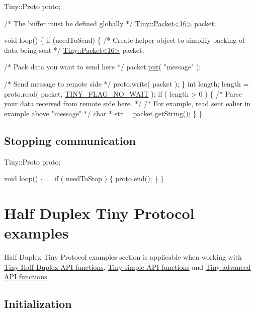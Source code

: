 \begin{DoxyCode}
Tiny::Proto proto;

\textcolor{comment}{/* The buffer must be defined globally */}
\hyperlink{classTiny_1_1Packet}{Tiny::Packet<16>} packet;

\textcolor{keywordtype}{void} loop()
\{
    \textcolor{keywordflow}{if} (needToSend)
    \{
        \textcolor{comment}{/* Create helper object to simplify packing of data being sent */}
        \hyperlink{classTiny_1_1Packet}{Tiny::Packet<16>} packet;

        \textcolor{comment}{/* Pack data you want to send here */}
        packet.\hyperlink{classTiny_1_1IPacket_a9d5ba62a453b9cd364c0e214c245f11d}{put}( \textcolor{stringliteral}{"message"} );

        \textcolor{comment}{/* Send message to remote side */}
        proto.write( packet );
    \}
    \textcolor{keywordtype}{int} length;
    length = proto.read( packet, \hyperlink{group__FLAGS__GROUP_gadadd60eb21d7949e6d097ad36aab9b2e}{TINY\_FLAG\_NO\_WAIT} );
    \textcolor{keywordflow}{if} ( length > 0 )
    \{
        \textcolor{comment}{/* Parse your data received from remote side here. */}
        \textcolor{comment}{/* For example, read sent ealier in example above "message" */}
        \textcolor{keywordtype}{char} * str = packet.\hyperlink{classTiny_1_1IPacket_ac6e6a22ce9a652954491a8d4db081d79}{getString}();
    \}
\}
\end{DoxyCode}
\hypertarget{arduino_arduino_tiny_close}{}\subsection{Stopping communication}\label{arduino_arduino_tiny_close}

\begin{DoxyCode}
Tiny::Proto proto;

\textcolor{keywordtype}{void} loop()
\{
    ...
    \textcolor{keywordflow}{if} ( needToStop )
    \{
        proto.end();
    \}
\}
\end{DoxyCode}
\hypertarget{arduino_arduino_tiny_hd}{}\section{Half Duplex Tiny Protocol examples}\label{arduino_arduino_tiny_hd}
Half Duplex Tiny Protocol examples section is applicable when working with \hyperlink{group__HALF__DUPLEX__API}{Tiny Half Duplex A\+PI functions}, \hyperlink{group__SIMPLE__API}{Tiny simple A\+PI functions} and \hyperlink{group__ADVANCED__API}{Tiny advanced A\+PI functions}.\hypertarget{arduino_arduino_tiny_hd_init}{}\subsection{Initialization}\label{arduino_arduino_tiny_hd_init}

